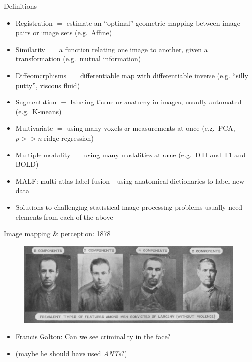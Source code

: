 \documentclass[ignorenonframetext,]{beamer}
\begin{document}
\begin{frame}{Definitions}

\begin{itemize}
\item
  Registration \(=\) estimate an ``optimal'' geometric mapping between
  image pairs or image sets (e.g.~Affine)
\item
  Similarity \(=\) a function relating one image to another, given a
  transformation (e.g.~mutual information)
\item
  Diffeomorphisms \(=\) differentiable map with differentiable inverse
  (e.g. ``silly putty'', viscous fluid)
\item
  {Segmentation \(=\) labeling tissue or anatomy in images, usually
  automated (e.g.~K-means)}
\item
  Multivariate \(=\) using many voxels or measurements at once
  (e.g.~PCA, \(p >> n\) ridge regression)
\item
  {Multiple modality \(=\) using many modalities at once (e.g.~DTI and
  T1 and BOLD)}
\item
  MALF: multi-atlas label fusion - using anatomical dictionaries to
  label new data
\item
  {Solutions to challenging statistical image processing problems
  usually need elements from each of the above}
\end{itemize}

\end{frame}

\begin{frame}{Image mapping \& perception: 1878}

\begin{figure}[htbp]
\centering
\includegraphics{./figures/galton.png}
\caption{}
\end{figure}

\begin{itemize}
\item
  Francis Galton: Can we see criminality in the face?
\item
  (maybe he should have used \emph{ANTs}?)
\end{itemize}

\end{frame}
\end{document}
